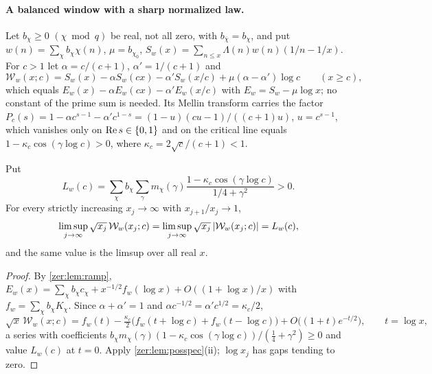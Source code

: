 \paragraph{A balanced window with a sharp normalized law.}
Let $b_\chi\ge0$ $(\chi\bmod q)$ be real, not all zero, with $b_{\overline\chi}=b_\chi$, and put
$w(n)=\sum_\chi b_\chi\chi(n)$, $\mu=b_{\chi_0}$, $S_w(x)=\sum_{n\le x}\Lambda(n)w(n)(1/n-1/x)$. For
$c>1$ let $\alpha=c/(c+1)$, $\alpha'=1/(c+1)$ and
\[
 \mathcal W_w(x;c)=S_w(x)-\alpha S_w(cx)-\alpha'S_w(x/c)+\mu(\alpha-\alpha')\log c\qquad(x\ge c),
\]
which equals $E_w(x)-\alpha E_w(cx)-\alpha'E_w(x/c)$ with $E_w=S_w-\mu\log x$; no constant of the
prime sum is needed. Its Mellin transform carries the factor
$P_c(s)=1-\alpha c^{s-1}-\alpha'c^{1-s}=(1-u)(cu-1)/((c+1)u)$, $u=c^{s-1}$, which vanishes only on
$\operatorname{Re} s\in\{0,1\}$ and on the critical line equals $1-\kappa_c\cos(\gamma\log c)>0$, where
$\kappa_c=2\sqrt c/(c+1)<1$.

\begin{theorem}\label{zer:thm:balanced}
Put
\[
 L_w(c)=\sum_\chi b_\chi\sum_\gamma m_\chi(\gamma)\frac{1-\kappa_c\cos(\gamma\log c)}{1/4+\gamma^2}>0 .
\]
For every strictly increasing $x_j\to\infty$ with $x_{j+1}/x_j\to1$,
\[
 \limsup_{j\to\infty}\sqrt{x_j}\,\mathcal W_w(x_j;c)=\limsup_{j\to\infty}\sqrt{x_j}\,\lvert\mathcal W_w(x_j;c)\rvert=L_w(c),
\]
and the same value is the limsup over all real $x$.
\end{theorem}
\begin{proof}
By \cref{zer:lem:ramp}, $E_w(x)=\sum_\chi b_\chi c_\chi+x^{-1/2}f_w(\log x)+O((1+\log x)/x)$ with
$f_w=\sum_\chi b_\chi K_\chi$. Since $\alpha+\alpha'=1$ and $\alpha c^{-1/2}=\alpha'c^{1/2}=\kappa_c/2$,
\[
 \sqrt x\,\mathcal W_w(x;c)=f_w(t)-\tfrac{\kappa_c}2\bigl(f_w(t+\log c)+f_w(t-\log c)\bigr)
 +O\bigl((1+t)e^{-t/2}\bigr),\qquad t=\log x,
\]
a series with coefficients $b_\chi m_\chi(\gamma)(1-\kappa_c\cos(\gamma\log c))/(\tfrac14+\gamma^2)\ge0$ and value
$L_w(c)$ at $t=0$. Apply \cref{zer:lem:posspec}(ii); $\log x_j$ has gaps tending to zero.
\end{proof}

